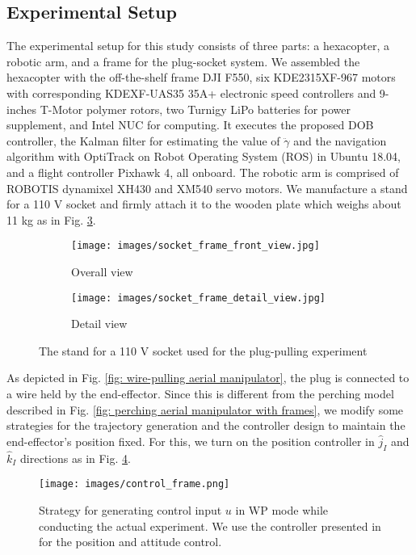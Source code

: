 \documentclass[letterpaper, 10 pt, conference]{ieeeconf}  %
\theoremstyle{definition}
\begin{document}
\subsection{Experimental Setup}
The experimental setup for this study consists of three parts: a hexacopter, a robotic arm, and a frame for the plug-socket system. We assembled the hexacopter with the off-the-shelf frame DJI F550, six KDE2315XF-967 motors with corresponding KDEXF-UAS35 35A+ electronic speed controllers and 9-inches T-Motor polymer rotors, two Turnigy LiPo batteries for power supplement, and Intel NUC for computing. It executes the proposed DOB controller, the Kalman filter for estimating the value of $\ddot{\gamma}$ and the navigation algorithm with OptiTrack on Robot Operating System (ROS) in Ubuntu 18.04, and a flight controller Pixhawk 4, all onboard. The robotic arm is comprised of ROBOTIS dynamixel XH430 and XM540 servo motors. We manufacture a stand for a 110 V socket and firmly attach it to the wooden plate which weighs about 11  kg as in Fig. \ref{fig: socket_frame}.
\begin{figure}[t]
\begin{subfigure}{0.24\textwidth} \centering
\texttt{[image: images/socket\_frame\_front\_view.jpg]} 
\caption{Overall view} 
\label{fig: socket_frame_front_view}
\end{subfigure}
\begin{subfigure}{0.24\textwidth} \centering
\texttt{[image: images/socket\_frame\_detail\_view.jpg]}
\caption{Detail view}
\label{fig: socket_frame_detail_view}
\end{subfigure}
\caption{The stand for a 110 V socket used for the plug-pulling experiment}
\label{fig: socket_frame}
\vspace{-0.4cm}
\end{figure}

As depicted in Fig. \ref{fig: wire-pulling aerial manipulator}, the plug is connected to a wire held by the end-effector. Since this is different from the perching model described in Fig. \ref{fig: perching aerial manipulator with frames}, we modify some strategies for the trajectory generation and the controller design to maintain the end-effector's position fixed. For this, we turn on the position controller in $\hat{j}_I$ and $\hat{k}_I$ directions as in Fig. \ref{fig: control_frame}. 
\begin{figure}[t]
\centering
\texttt{[image: images/control\_frame.png]}
\caption{Strategy for generating control input $u$ in WP mode while conducting the actual experiment. We use the controller presented in \cite{lee2020aerial_2} for the position and attitude control.} \label{fig: control_frame}
\vspace{-0.4cm}
\end{figure}
\end{document}
